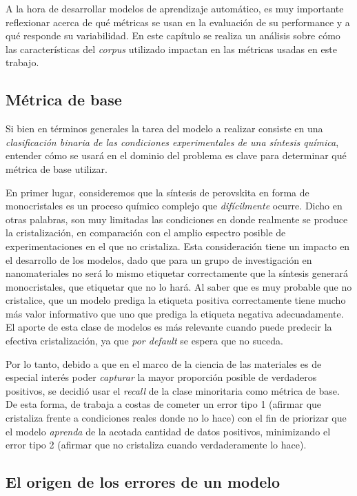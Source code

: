 A la hora de desarrollar modelos de aprendizaje automático, es muy importante reflexionar acerca de qué métricas se usan en la evaluación de su performance y a qué responde su variabilidad. En este capítulo se realiza un análisis sobre cómo las características del \textit{corpus} utilizado impactan en las métricas usadas en este trabajo.

\subsection{Métrica de base}

Si bien en términos generales la tarea del modelo a realizar consiste en una \textit{clasificación binaria de las condiciones experimentales de una síntesis química}, entender cómo se usará en el dominio del problema es clave para determinar qué métrica de base utilizar.

En primer lugar, consideremos que la síntesis de perovskita en forma de monocristales es un proceso químico complejo que \textit{difícilmente} ocurre. Dicho en otras palabras, son muy limitadas las condiciones en donde realmente se produce la cristalización, en comparación con el amplio espectro posible de experimentaciones en el que no cristaliza. Esta consideración tiene un impacto en el desarrollo de los modelos, dado que para un grupo de investigación en nanomateriales no será lo mismo etiquetar correctamente que la síntesis generará monocristales, que etiquetar que no lo hará. Al saber que es muy probable que no cristalice, que un modelo prediga la etiqueta positiva correctamente tiene mucho más valor informativo que uno que prediga la etiqueta negativa adecuadamente. El aporte de esta clase de modelos es más relevante cuando puede predecir la efectiva cristalización, ya que \textit{por default} se espera que no suceda.

Por lo tanto, debido a que en el marco de la ciencia de las materiales es de especial interés poder \textit{capturar} la mayor proporción posible de verdaderos positivos, se decidió usar el \textit{recall} de la clase minoritaria como métrica de base. De esta forma, de trabaja a costas de cometer un error tipo 1 (afirmar que cristaliza frente a condiciones reales donde no lo hace) con el fin de priorizar que el modelo \textit{aprenda} de la acotada cantidad de datos positivos, minimizando el error tipo 2 (afirmar que no cristaliza cuando verdaderamente lo hace).

\subsection{El origen de los errores de un modelo}

